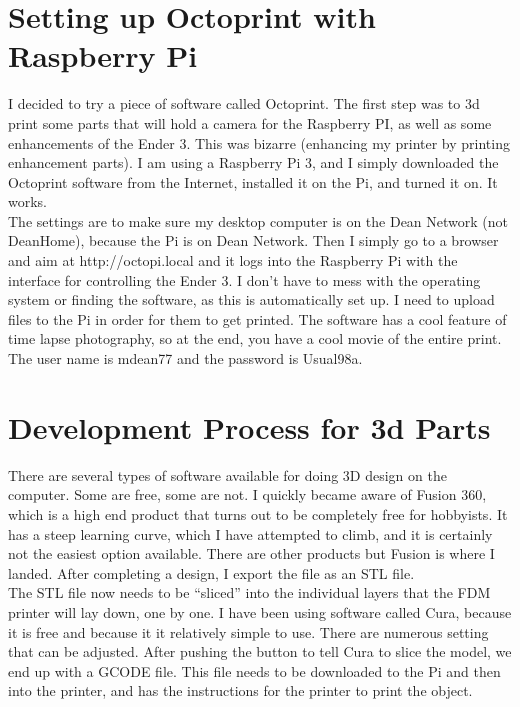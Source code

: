 \section{Setting up Octoprint with Raspberry Pi}

I decided to try a piece of software called Octoprint.  The first step was to 3d print some parts that will hold a camera for the Raspberry PI, as well as some enhancements
of the Ender 3.  This was bizarre (enhancing my printer by printing enhancement parts).  I am using a Raspberry Pi 3, and I simply downloaded the Octoprint software from the Internet,
installed it on the Pi, and turned it on.  It works.\\

The settings are to make sure my desktop computer is on the Dean Network (not DeanHome), because the Pi is on Dean Network.  Then I simply go to a browser
and aim at http://octopi.local and it logs into the Raspberry Pi with the interface for controlling the Ender 3.  I don't have to mess with the operating system or finding the software,
as this is automatically set up.  I need to upload files to the Pi in order for them to get printed.  The software has a cool feature of time lapse photography, so at the end, you have
a cool movie of the entire print.\\

The user name is mdean77 and the password is Usual98a.  \\

\section{Development Process for 3d Parts}

There are several types of software available for doing 3D design on the computer.  Some are free, some are not.  I quickly became aware of Fusion 360, which is a high
end product that turns out to be completely free for hobbyists.  It has a steep learning curve, which I have attempted to climb, and it is certainly not the easiest option
available.  There are other products but Fusion is where I landed.  After completing a design, I export the file as an STL file.\\

The STL file now needs to be ``sliced'' into the individual layers that the FDM printer will lay down, one by one.  I have been using software called Cura, because it is free
and because it it relatively simple to use.  There are numerous setting that can be adjusted.  After pushing the button to tell Cura to slice the model, we end up with a GCODE file.  This file needs to be downloaded to the Pi and then into the printer, and has the instructions for the printer to print the object.


